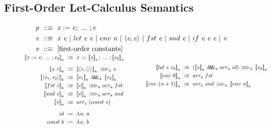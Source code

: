 \subsection{First-Order Let-Calculus Semantics}

\begin{figure}[!tb]\centering
\smallmathfont
\begin{align*}
	\mathit{p} &\ ::\equiv \ \mathit{x := e};\ ...\ ; \mathit{e}
\\
	\mathit{e} &\ ::\equiv \ \mathit{x~e}\ |\ let~\mathit{e~e}\ |\ env~\mathit{n}\ |\ \mathit{\pair{e,e}}\ |\ fst~\mathit{e}\ |\ snd~\mathit{e}\ |\ if~\mathit{e~e~e}\ |\ \mathit{v}
\\
	\mathit{v} &\ ::\equiv \ \text{[first-order constants]}
\\[-6pt]
\end{align*}
\begin{align*}
\begin{aligned}[t]
	\meaningof{\mathit{x} := \mathit{e};\ ...\ ; \mathit{e_b}}\gen &\ :\equiv\
		\mathit{x} := \meaningof{\mathit{e}}\gen;\ ...\ ; \meaningof{\mathit{e_b}}\gen
\\[6pt]
	\meaningof{\mathit{x}~\mathit{e}}\gen &\ :\equiv\
		\meaningof{\pair{\mathit{e},\pair{}}}\gen~\arrowcomp\gen~\mathit{x}
\\
	\meaningof{\pair{\mathit{e}_1,\mathit{e}_2}}\gen &\ :\equiv\
		\meaningof{\mathit{e}_1}\gen~\arrowpair\gen~\meaningof{\mathit{e}_2}\gen
\\
	\meaningof{fst~\mathit{e}}\gen &\ :\equiv\
		\meaningof{\mathit{e}}\gen~\arrowcomp\gen~\arrowarr\gen~fst
\\
	\meaningof{snd~\mathit{e}}\gen &\ :\equiv\
		\meaningof{\mathit{e}}\gen~\arrowcomp\gen~\arrowarr\gen~snd
\\
	\meaningof{\mathit{v}}\gen &\ :\equiv\ \arrowarr\gen~(const~\mathit{v})
\\[6pt]
	id &\ := \ \fun{a} a
\\
	const~b &\ := \ \fun{a} b
\\
\end{aligned}
&\tab\tab\tab\tab
\begin{aligned}[t]
\\[3pt]
	\meaningof{let~\mathit{e}~\mathit{e_b}}\gen &\ :\equiv\ 
		(\meaningof{\mathit{e}}\gen~\arrowpair\gen~\arrowarr\gen~id)~
			\arrowcomp\gen~
		\meaningof{\mathit{e_b}}\gen
\\
	\meaningof{env~0}\gen &\ :\equiv\ \arrowarr\gen~fst
\\
	\meaningof{env~(\mathit{n}+1)}\gen &\ :\equiv\ \arrowarr\gen~snd~\arrowcomp\gen~\meaningof{env~\mathit{n}}\gen

\end{aligned}
\end{align*}
\end{figure}
